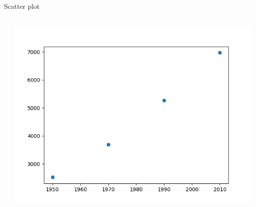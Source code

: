 \begin{frame}[t, fragile]{Scatter plot}
  \begin{columns}
    \begin{column}{0.5\textwidth}
          
    \end{column}

    \begin{column}{0.5\textwidth}
      \begin{center}
        \includegraphics[scale=.40]{aula-2/figuras/matplotlib-scatterplot-1.png}
      \end{center}
    \end{column}
  \end{columns}
\end{frame}
%

 